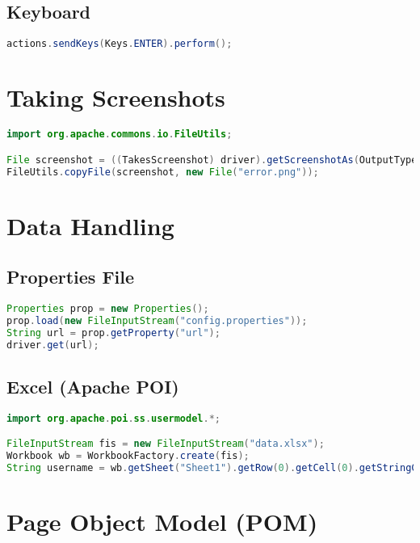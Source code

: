 \documentclass[a4paper,12pt]{article}
\begin{document}
\subsection{Keyboard}
\begin{lstlisting}[language=Java]
actions.sendKeys(Keys.ENTER).perform();
\end{lstlisting}

\section{Taking Screenshots}

\begin{lstlisting}[language=Java]
import org.apache.commons.io.FileUtils;

File screenshot = ((TakesScreenshot) driver).getScreenshotAs(OutputType.FILE);
FileUtils.copyFile(screenshot, new File("error.png"));
\end{lstlisting}

\section{Data Handling}

\subsection{Properties File}
\begin{lstlisting}[language=Java]
Properties prop = new Properties();
prop.load(new FileInputStream("config.properties"));
String url = prop.getProperty("url");
driver.get(url);
\end{lstlisting}

\subsection{Excel (Apache POI)}
\begin{lstlisting}[language=Java]
import org.apache.poi.ss.usermodel.*;

FileInputStream fis = new FileInputStream("data.xlsx");
Workbook wb = WorkbookFactory.create(fis);
String username = wb.getSheet("Sheet1").getRow(0).getCell(0).getStringCellValue();
\end{lstlisting}

\section{Page Object Model (POM)}
\end{document}
